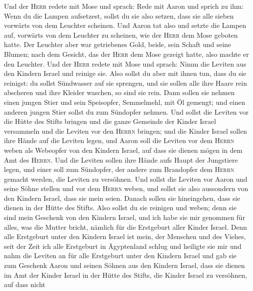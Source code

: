  Und der \textsc{Herr} redete mit Mose und sprach:
 Rede mit Aaron und sprich zu ihm: Wenn du die Lampen
aufsetzest, sollst du sie also setzen, dass sie alle sieben vorwärts von
dem Leuchter scheinen.  Und Aaron tat also und setzte die
Lampen auf, vorwärts von dem Leuchter zu scheinen, wie der \textsc{Herr}
dem Mose geboten hatte.  Der Leuchter aber war getriebenes
Gold, beide, sein Schaft und seine Blumen; nach dem Gesicht, das der
\textsc{Herr} dem Mose gezeigt hatte, also machte er den Leuchter.
 Und der \textsc{Herr} redete mit Mose und sprach:
 Nimm die Leviten aus den Kindern Israel und reinige sie.
 Also sollst du aber mit ihnen tun, dass du sie reinigst:
du sollst Sündwasser auf sie sprengen, und sie sollen alle ihre Haare
rein abscheren und ihre Kleider waschen, so sind sie rein.
 Dann sollen sie nehmen einen jungen Stier und sein
Speisopfer, Semmelmehl, mit Öl gemengt; und einen anderen jungen Stier
sollst du zum Sündopfer nehmen.  Und sollst die Leviten
vor die Hütte des Stifts bringen und die ganze Gemeinde der Kinder
Israel versammeln  und die Leviten vor den \textsc{Herrn}
bringen; und die Kinder Israel sollen ihre Hände auf die Leviten legen,
 und Aaron soll die Leviten vor dem \textsc{Herrn} weben
als Webeopfer von den Kindern Israel, auf dass sie dienen mögen in dem
Amt des \textsc{Herrn}.  Und die Leviten sollen ihre
Hände aufs Haupt der Jungstiere legen, und einer soll zum Sündopfer, der
andere zum Brandopfer dem \textsc{Herrn} gemacht werden, die Leviten zu
versöhnen.  Und sollst die Leviten vor Aaron und seine
Söhne stellen und vor dem \textsc{Herrn} weben,  und
sollst sie also aussondern von den Kindern Israel, dass sie mein seien.
 Danach sollen sie hineingehen, dass sie dienen in der
Hütte des Stifts. Also sollst du sie reinigen und weben; 
denn sie sind mein Geschenk von den Kindern Israel, und ich habe sie mir
genommen für alles, was die Mutter bricht, nämlich für die Erstgeburt
aller Kinder Israel.  Denn alle Erstgeburt unter den
Kindern Israel ist mein, der Menschen und des Viehes, seit der Zeit ich
alle Erstgeburt in Ägyptenland schlug und heiligte sie mir
 und nahm die Leviten an für alle Erstgeburt unter den
Kindern Israel  und gab sie zum Geschenk Aaron und seinen
Söhnen aus den Kindern Israel, dass sie dienen im Amt der Kinder Israel
in der Hütte des Stifts, die Kinder Israel zu versöhnen, auf dass nicht
